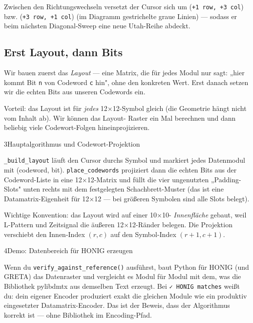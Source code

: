 Zwischen den Richtungswechseln versetzt der Cursor sich um
(\texttt{+1 row, +3 col}) bzw. (\texttt{+3 row, +1 col}) (im
Diagramm gestrichelte graue Linien) — sodass er beim nächsten
Diagonal-Sweep eine neue Utah-Reihe abdeckt.

\subsection*{Erst Layout, dann Bits}

Wir bauen zuerst das \emph{Layout} — eine Matrix, die für jedes Modul
nur sagt: „hier kommt Bit \texttt{n} von Codeword \texttt{c} hin",
ohne den konkreten Wert. Erst danach setzen wir die echten Bits aus
unseren Codewords ein.

Vorteil: das Layout ist für \emph{jedes} 12$\times$12-Symbol gleich
(die Geometrie hängt nicht vom Inhalt ab). Wir können das Layout-
Raster ein Mal berechnen und dann beliebig viele Codewort-Folgen
hineinprojizieren.

\begin{pythoneinheit}{3}{Hauptalgorithmus und Codewort-Projektion}

\texttt{\_build\_layout} läuft den Cursor durchs Symbol und markiert
jedes Datenmodul mit (codeword, bit). \texttt{place\_codewords}
projiziert dann die echten Bits aus der Codeword-Liste in eine
12$\times$12-Matrix und füllt die vier ungenutzten „Padding-Slots"
unten rechts mit dem festgelegten Schachbrett-Muster (das ist eine
Datamatrix-Eigenheit für 12$\times$12 — bei größeren Symbolen sind
alle Slots belegt).

Wichtige Konvention: das Layout wird auf einer 10$\times$10-
\emph{Innenfläche} gebaut, weil L-Pattern und Zeitsignal die äußeren
12$\times$12-Ränder belegen. Die Projektion verschiebt den Innen-Index
$(r, c)$ auf den Symbol-Index $(r+1, c+1)$.
\end{pythoneinheit}

\begin{pythoneinheit}{4}{Demo: Datenbereich für HONIG erzeugen}

Wenn du \texttt{verify\_against\_reference()} ausführst, baut Python
für HONIG (und GRETA) das Datenraster und vergleicht es Modul für
Modul mit dem, was die Bibliothek pylibdmtx aus demselben Text
erzeugt. Bei \texttt{✓ HONIG matches} weißt du: dein eigener Encoder
produziert exakt die gleichen Module wie ein produktiv eingesetzter
Datamatrix-Encoder. Das ist der Beweis, dass der Algorithmus korrekt
ist — ohne Bibliothek im Encoding-Pfad.
\end{pythoneinheit}

